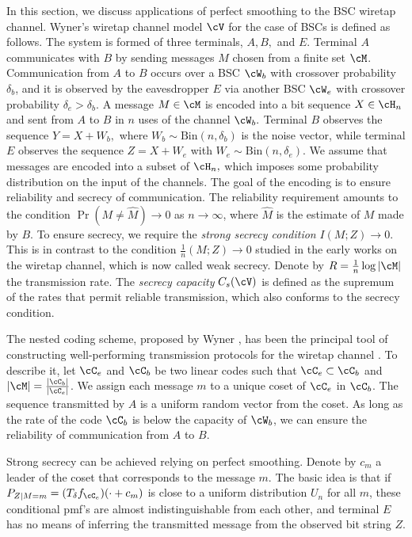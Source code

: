 \documentclass{amsart}
\theoremstyle{remark}
\begin{document}
In this section, we discuss applications of perfect smoothing to the BSC wiretap 
channel. Wyner's wiretap channel model $\cV$ \cite{wyner1975wire} for the case of 
BSCs is defined as follows. The system is formed of three terminals, $A,B,$ and $E$. 
Terminal $A$ communicates with $B$ by sending messages $M$ chosen from a finite set 
$\cM$. Communication from $A$ to $B$ occurs over a BSC $\cW_b$ with crossover 
probability $\delta_b$, and it is observed by the eavesdropper $E$ via another BSC 
$\cW_e$ with crossover probability $\delta_e>\delta_b.$ A message $M\in\cM$ is 
encoded into a bit sequence $X\in\cH_n$ and sent from $A$ to $B$ in $n$ uses of the 
channel $\cW_b.$ Terminal $B$ observes
the sequence $Y=X+W_b,$ where $W_b\sim\text{Bin}(n,\delta_b)$ is the noise vector, while terminal $E$ observes the sequence $Z=X+W_e$ with $W_e\sim \text{Bin}(n,\delta_e)$. We assume that messages are encoded into a subset of $\cH_n,$ which imposes some probability distribution on the input of the channels.
The goal of the encoding is to ensure reliability and secrecy of communication. The reliability requirement amounts to the condition $\Pr(M \neq \hat{M}) \to 0$ as $n\to\infty$, where $\hat{M}$ is the estimate of $M$ made by $B$. To ensure
secrecy, we require the {\em strong secrecy condition} $I(M;Z) \rightarrow 0$. This is in contrast to the condition
$\frac 1n(M;Z) \rightarrow 0$ studied in the early works on the wiretap channel, which is now called weak secrecy. Denote by $R=\frac 1n\log|\cM|$ the transmission rate. The {\em secrecy capacity} $C_s(\cV)$ is defined as the supremum of the rates that permit reliable transmission, which also conforms to the secrecy condition.

The nested coding scheme, proposed by Wyner \cite{wyner1975wire}, has been 
the principal tool of constructing well-performing transmission protocols for the wiretap channel \cite{thangaraj2007applications,mahdavifar2011achieving,gulcu2016achieving}. To describe it, 
let $\cC_e $ and $\cC_b $ be two linear codes such that $\cC_e \subset \cC_b$ and $|\cM| = \frac{|\cC_b|}{|\cC_e|}$. We assign each message $m$ to a unique coset of $\cC_e$ in $\cC_b$. The sequence transmitted by $A$ is a uniform random vector from 
the coset. As long as the rate of the code $\cC_b$ is below the capacity of $\cW_b$,
we can ensure the reliability of communication from $A$ to $B$.

Strong secrecy can be achieved relying on perfect smoothing. Denote by $c_m$ a leader
of the coset that corresponds to the message $m$. The basic idea is that if $P_{Z|M=m} = (T_{\delta}f_{\cC_e})
(\cdot+c_m)$ is close to a uniform distribution $U_n$ for all $m$, these conditional pmf's are almost indistinguishable from each other, and terminal $E$ has no means of inferring the transmitted message from the observed bit string $Z$. 
\end{document}
